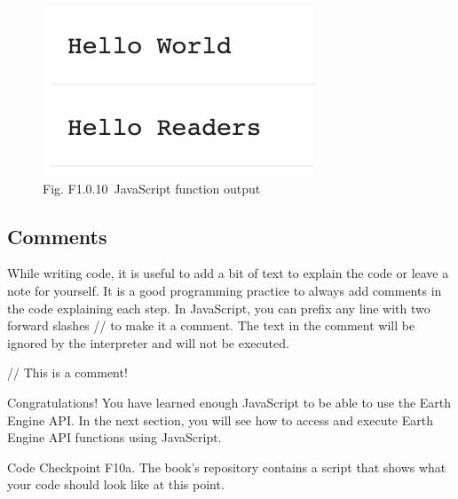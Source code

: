 \documentclass[
  letterpaper,
  DIV=11,
  numbers=noendperiod]{scrreprt}
\newenvironment{Shaded}{\begin{snugshade}}{\end{snugshade}}
\newcommand{\CommentTok}[1]{\textcolor[rgb]{0.37,0.37,0.37}{#1}}
\begin{document}
\begin{figure}

{\centering \includegraphics{./F1/image54.png}

}

\caption{Fig. F1.0.10~JavaScript function output}

\end{figure}

\hypertarget{comments}{%
\subsection{Comments}\label{comments}}

While writing code, it is useful to add a bit of text to explain the
code or leave a note for yourself. It is a good programming practice to
always add comments in the code explaining each step. In JavaScript, you
can prefix any line with two forward slashes // to make it a comment.
The text in the comment will be ignored by the interpreter and will not
be executed.

\begin{Shaded}
\begin{Highlighting}[]
\CommentTok{// This is a comment!}
\end{Highlighting}
\end{Shaded}

Congratulations! You have learned enough JavaScript to be able to use
the Earth Engine API. In the next section, you will see how to access
and execute Earth Engine API functions using JavaScript.

\begin{tcolorbox}[enhanced jigsaw, left=2mm, breakable, rightrule=.15mm, opacityback=0, colframe=quarto-callout-note-color-frame, colbacktitle=quarto-callout-note-color!10!white, arc=.35mm, opacitybacktitle=0.6, toptitle=1mm, colback=white, leftrule=.75mm, title=\textcolor{quarto-callout-note-color}{\faInfo}\hspace{0.5em}{Note}, toprule=.15mm, bottomtitle=1mm, titlerule=0mm, bottomrule=.15mm, coltitle=black]

Code Checkpoint F10a. The book's repository contains a script that shows
what your code should look like at this point.

\end{tcolorbox}
\end{document}
